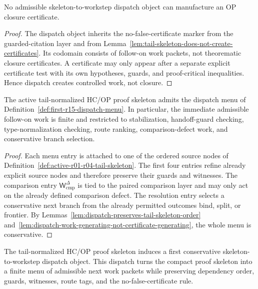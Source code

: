 \begin{lemma}
\label{lem:dispatch-work-generating-not-certificate-generating}
No admissible skeleton-to-workstep dispatch object can manufacture an OP closure certificate.
\end{lemma}

\begin{proof}
The dispatch object inherits the no-false-certificate marker from the guarded-citation layer and from Lemma~\ref{lem:tail-skeleton-does-not-create-certificates}. Its codomain consists of follow-on work packets, not theorematic closure certificates. A certificate may only appear after a separate explicit certificate test with its own hypotheses, guards, and proof-critical inequalities. Hence dispatch creates controlled work, not closure.
\end{proof}

\begin{proposition}
\label{prop:first-controlled-next-work-selection-hcop-skeleton}
The active tail-normalized HC/OP proof skeleton admits the dispatch menu of Definition~\ref{def:first-r15-dispatch-menu}. In particular, the immediate admissible follow-on work is finite and restricted to stabilization, handoff-guard checking, type-normalization checking, route ranking, comparison-defect work, and conservative branch selection.
\end{proposition}

\begin{proof}
Each menu entry is attached to one of the ordered source nodes of Definition~\ref{def:active-r01-r04-tail-skeleton}. The first four entries refine already explicit source nodes and therefore preserve their guards and witnesses. The comparison entry \(\mathsf W_{\mathrm{cmp}}^{\Delta}\) is tied to the paired comparison layer and may only act on the already defined comparison defect. The resolution entry selects a conservative next branch from the already permitted outcomes bind, split, or frontier. By Lemmas~\ref{lem:dispatch-preserves-tail-skeleton-order} and~\ref{lem:dispatch-work-generating-not-certificate-generating}, the whole menu is conservative.
\end{proof}

\begin{theorem}
\label{thm:first-skeleton-to-workstep-hcop-dispatch}
The tail-normalized HC/OP proof skeleton induces a first conservative skeleton-to-workstep dispatch object. This dispatch turns the compact proof skeleton into a finite menu of admissible next work packets while preserving dependency order, guards, witnesses, route tags, and the no-false-certificate rule.
\end{theorem}

